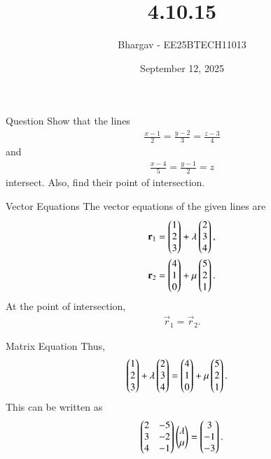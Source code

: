 \documentclass{beamer}
\title{4.10.15}
\date{September 12, 2025}
\author{Bhargav - EE25BTECH11013}
\begin{document}
\frame{\titlepage}

\begin{frame}{Question}
Show that the lines
\begin{align}
\frac{x-1}{2} = \frac{y-2}{3} = \frac{z-3}{4}
\end{align}
and
\begin{align}
\frac{x-4}{5} = \frac{y-1}{2} = z
\end{align}
intersect. Also, find their point of intersection.
\end{frame}

\begin{frame}{Vector Equations}
The vector equations of the given lines are
\begin{align}
\mathbf{r}_1 &= \begin{pmatrix}1\\2\\3\end{pmatrix} + \lambda \begin{pmatrix}2\\3\\4\end{pmatrix}, \\
\mathbf{r}_2 &= \begin{pmatrix}4\\1\\0\end{pmatrix} + \mu \begin{pmatrix}5\\2\\1\end{pmatrix}.
\end{align}
At the point of intersection,
\begin{align}
\vec{r}_1 = \vec{r}_2.
\end{align}
\end{frame}

\begin{frame}{Matrix Equation}
Thus,
\begin{align}
\begin{pmatrix}1\\2\\3\end{pmatrix} + \lambda \begin{pmatrix}2\\3\\4\end{pmatrix} &= \begin{pmatrix}4\\1\\0\end{pmatrix} + \mu \begin{pmatrix}5\\2\\1\end{pmatrix}.
\end{align}
This can be written as
\begin{align}
\begin{pmatrix}2 & -5 \\ 3 & -2 \\ 4 & -1\end{pmatrix}\begin{pmatrix}\lambda \\ \mu\end{pmatrix} = \begin{pmatrix}3 \\ -1 \\ -3\end{pmatrix}.
\end{align}
\end{frame}
\end{document}
